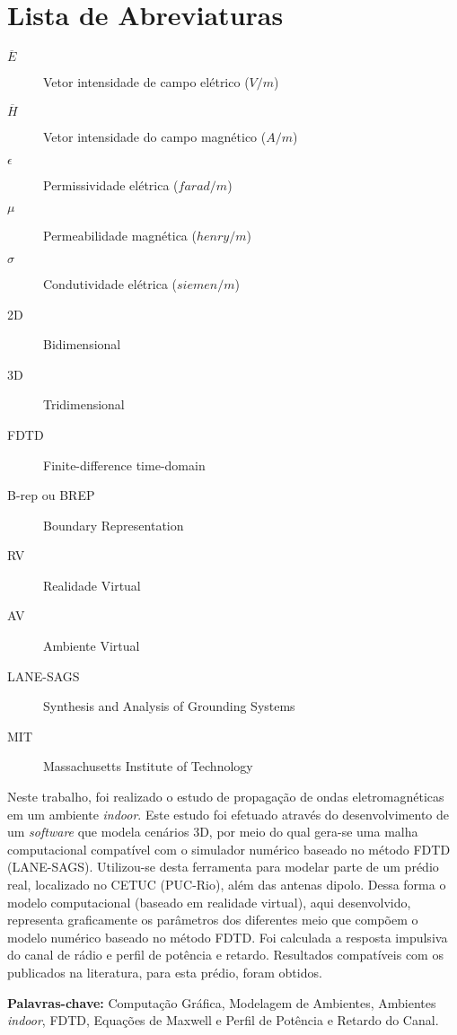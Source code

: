 \documentclass{./public/ufpatccdoisautores}
\begin{document}
\tableofcontents    \clearpage

\listoffigures \clearpage \listoftables \clearpage

\chapter*{Lista de Abreviaturas}

\begin{description}
	\item[$\overline{E}$]	Vetor intensidade de campo elétrico ($V/m$)
	\item[$\overline{H}$]	Vetor intensidade do campo magnético ($A/m$)
	\item[$\epsilon$]	Permissividade elétrica ($farad/m$)
	\item[$\mu$]	Permeabilidade magnética ($henry/m$)
	\item[$\sigma$]	Condutividade elétrica ($siemen/m$)
	\item[2D]	Bidimensional 
	\item[3D]	Tridimensional 
	\item[FDTD]	Finite-difference time-domain 
	\item[B-rep ou BREP]	Boundary Representation 
	\item[RV]	Realidade Virtual 
	\item[AV]	Ambiente Virtual 
	\item[LANE-SAGS]	Synthesis and Analysis of Grounding Systems 
	\item[MIT]	Massachusetts Institute of Technology
\end{description}

\clearpage

\begin{ufpaResumo}
	Neste trabalho, foi realizado o estudo de propagação de ondas eletromagnéticas em um ambiente \textit{indoor}. Este estudo foi efetuado através do desenvolvimento de um \textit{software} que modela cenários 3D, por meio do qual gera-se uma malha computacional compatível com o simulador numérico baseado no método FDTD (LANE-SAGS). Utilizou-se desta ferramenta para modelar parte de um prédio real, localizado no CETUC (PUC-Rio), além das antenas dipolo. Dessa forma o modelo computacional (baseado em realidade virtual), aqui desenvolvido, representa graficamente os parâmetros dos diferentes meio que compõem o modelo numérico baseado no método FDTD. Foi calculada  a resposta impulsiva do canal de rádio e perfil de potência e retardo. Resultados compatíveis com os publicados na literatura, para esta prédio, foram obtidos.


\textbf{Palavras-chave:} Computação Gráfica, Modelagem de Ambientes, Ambientes \textit{indoor}, FDTD, Equações de Maxwell e Perfil de Potência e Retardo do Canal.
\end{ufpaResumo}
\end{document}
